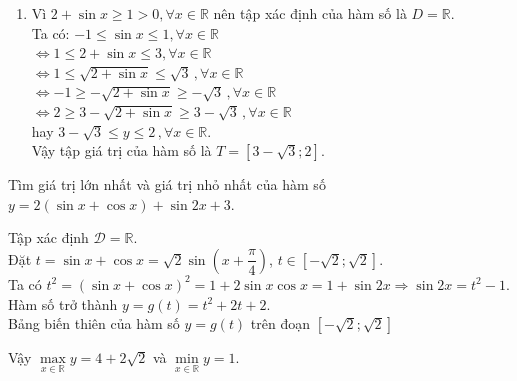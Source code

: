 \begin{ex}
{\begin{enumerate}
			      Vậy tập giá trị của hàm số là $T=\left[-9;-5\right]$.
			\item Vì $2+\sin x\ge 1>0,\forall x\in \mathbb{R}$ nên tập xác định của hàm số là $D=\mathbb{R}$.\\
			      Ta có: $-1\le \sin x\le 1,\forall x\in \mathbb{R}$\\
			      $\Leftrightarrow 1\le 2+\sin x\le 3,\forall x\in \mathbb{R}$\\
			      $\Leftrightarrow 1\le \sqrt{2+\sin x}\le \sqrt{3}\,,\forall x\in \mathbb{R}$\\
			      $\Leftrightarrow -1\ge -\sqrt{2+\sin x}\ge -\sqrt{3}\,,\forall x\in \mathbb{R}$\\
			      $\Leftrightarrow 2\ge 3-\sqrt{2+\sin x}\ge 3-\sqrt{3}\,,\forall x\in \mathbb{R}$\\
			      hay $3-\sqrt{3}\le y\le 2\,,\forall x\in \mathbb{R}$.\\
			      Vậy tập giá trị của hàm số là $T=\left[3-\sqrt{3};2\right]$.
		\end{enumerate}
	}
\end{ex}

\begin{ex}%
	Tìm giá trị lớn nhất và giá trị nhỏ nhất của hàm số  $y=2(\sin x+\cos x)+\sin 2 x+3$.
	\loigiai
	{Tập xác định $\mathscr{D}=\mathbb{R}$.\\
		Đặt $t=\sin x+ \cos x=\sqrt{2}\sin \left(x+\dfrac{\pi}{4}\right)$, $t\in \left[-\sqrt{2};\sqrt{2}\right]$.\\
		Ta có $t^2=\left(\sin x+ \cos x\right)^2=1+2\sin x\cos x=1+\sin 2x\Rightarrow \sin 2x =t^2-1$.\\
		Hàm số trở thành $y=g(t)=t^2+2t+2$. \\
		Bảng biến thiên của hàm số $y=g(t)$ trên đoạn $ \left[-\sqrt{2};\sqrt{2}\right]$
		\begin{center}
		\end{center}
		Vậy $\max\limits_{x \in \mathbb{R}} y=4+2\sqrt{2}$ và $\min\limits_{x \in \mathbb{R}} y=1$.
	}
\end{ex}

